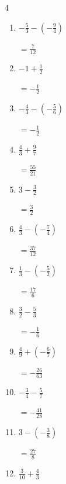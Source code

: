 \begin{multicols}{4}
\begin{enumerate}
        $\displaystyle =\frac{33}{35}$

\columnbreak %

  \item $\displaystyle -\frac{5}{3} - \left(-\frac{9}{4}\right)$

        $\displaystyle =\frac{7}{12}$

  \item $\displaystyle -1 + \frac{1}{2}$

        $\displaystyle =-\frac{1}{2}$

  \item $\displaystyle -\frac{4}{3} - \left(-\frac{5}{6}\right)$

        $\displaystyle =-\frac{1}{2}$

  \item $\displaystyle \frac{4}{3} + \frac{9}{7}$

        $\displaystyle =\frac{55}{21}$

  \item $\displaystyle 3 - \frac{3}{2}$

        $\displaystyle =\frac{3}{2}$

  \item $\displaystyle \frac{4}{3} - \left(-\frac{7}{4}\right)$

        $\displaystyle =\frac{37}{12}$

  \item $\displaystyle \frac{1}{3} - \left(-\frac{5}{2}\right)$

        $\displaystyle =\frac{17}{6}$

  \item $\displaystyle \frac{3}{2} - \frac{5}{3}$

        $\displaystyle =-\frac{1}{6}$

  \item $\displaystyle \frac{4}{9} + \left(-\frac{6}{7}\right)$

        $\displaystyle =-\frac{26}{63}$

  \item $\displaystyle -\frac{3}{4} - \frac{5}{7}$

        $\displaystyle =-\frac{41}{28}$

\columnbreak %

  \item $\displaystyle 3 - \left(-\frac{3}{8}\right)$

        $\displaystyle =\frac{27}{8}$

  \item $\displaystyle \frac{3}{10} + \frac{4}{3}$


\end{enumerate}
\end{multicols}

